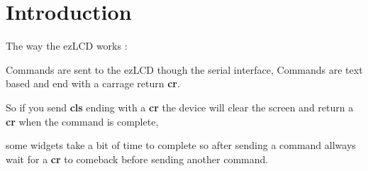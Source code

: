 \hypertarget{group__ez_l_c_d}{\section{Introduction}
\label{group__ez_l_c_d}
}
The way the ez\-L\-C\-D works \-:\par
 Commands are sent to the ez\-L\-C\-D though the serial interface, Commands are text based and end with a carrage return {\bfseries cr}.\par
 So if you send {\bfseries cls} ending with a {\bfseries cr} the device will clear the screen and return a {\bfseries cr} when the command is complete,\par
 some widgets take a bit of time to complete so after sending a command allways wait for a {\bfseries cr} to comeback before sending another command.\par
 